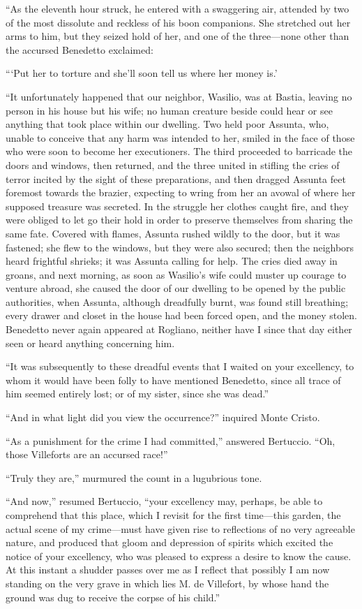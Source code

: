 “As the eleventh hour struck, he entered with a swaggering air,
attended by two of the most dissolute and reckless of his boon
companions. She stretched out her arms to him, but they seized hold of
her, and one of the three—none other than the accursed Benedetto
exclaimed:

“‘Put her to torture and she’ll soon tell us where her money is.’

“It unfortunately happened that our neighbor, Wasilio, was at Bastia,
leaving no person in his house but his wife; no human creature beside
could hear or see anything that took place within our dwelling. Two
held poor Assunta, who, unable to conceive that any harm was intended
to her, smiled in the face of those who were soon to become her
executioners. The third proceeded to barricade the doors and windows,
then returned, and the three united in stifling the cries of terror
incited by the sight of these preparations, and then dragged Assunta
feet foremost towards the brazier, expecting to wring from her an
avowal of where her supposed treasure was secreted. In the struggle her
clothes caught fire, and they were obliged to let go their hold in
order to preserve themselves from sharing the same fate. Covered with
flames, Assunta rushed wildly to the door, but it was fastened; she
flew to the windows, but they were also secured; then the neighbors
heard frightful shrieks; it was Assunta calling for help. The cries
died away in groans, and next morning, as soon as Wasilio’s wife could
muster up courage to venture abroad, she caused the door of our
dwelling to be opened by the public authorities, when Assunta, although
dreadfully burnt, was found still breathing; every drawer and closet in
the house had been forced open, and the money stolen. Benedetto never
again appeared at Rogliano, neither have I since that day either seen
or heard anything concerning him.

“It was subsequently to these dreadful events that I waited on your
excellency, to whom it would have been folly to have mentioned
Benedetto, since all trace of him seemed entirely lost; or of my
sister, since she was dead.”

“And in what light did you view the occurrence?” inquired Monte Cristo.

“As a punishment for the crime I had committed,” answered Bertuccio.
“Oh, those Villeforts are an accursed race!”

“Truly they are,” murmured the count in a lugubrious tone.

“And now,” resumed Bertuccio, “your excellency may, perhaps, be able to
comprehend that this place, which I revisit for the first time—this
garden, the actual scene of my crime—must have given rise to
reflections of no very agreeable nature, and produced that gloom and
depression of spirits which excited the notice of your excellency, who
was pleased to express a desire to know the cause. At this instant a
shudder passes over me as I reflect that possibly I am now standing on
the very grave in which lies M. de Villefort, by whose hand the ground
was dug to receive the corpse of his child.”

